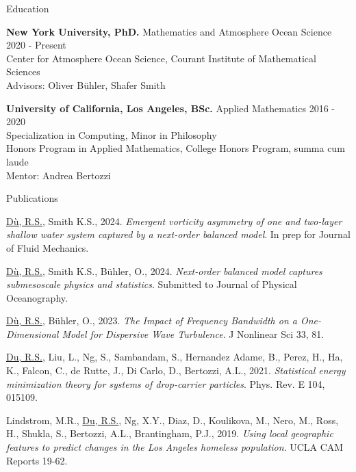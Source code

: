 \documentclass{resume} %
\begin{document}

\begin{rSection}{Education}

{\bf New York University, PhD.} Mathematics and Atmosphere Ocean Science \hfill {2020 - Present} \\
Center for Atmosphere Ocean Science, Courant Institute of Mathematical Sciences\\
Advisors: Oliver B\"uhler, Shafer Smith

{\bf University of California, Los Angeles, BSc.} Applied Mathematics \hfill {2016 - 2020} \\
Specialization in Computing, Minor in Philosophy\\
Honors Program in Applied Mathematics, College Honors Program, summa cum laude\\
Mentor: Andrea Bertozzi


\end{rSection}


\begin{rSection}{Publications}
\begin{etaremune}
    \item \underline{D\`u, R.S.}, Smith K.S., 2024. \textit{Emergent vorticity asymmetry of one and two-layer shallow water system captured by a next-order balanced model}. In prep for Journal of Fluid Mechanics.
    \item \underline{D\`u, R.S.}, Smith K.S., Bühler, O., 2024. \textit{Next-order balanced model captures submesoscale physics and statistics}. Submitted to Journal of Physical Oceanography.
    \item \underline{D\`u, R.S.}, B\"uhler, O., 2023. \textit{The Impact of Frequency Bandwidth on a One-Dimensional Model for Dispersive Wave Turbulence}. J Nonlinear Sci 33, 81.
    \item \underline{Du, R.S.}, Liu, L., Ng, S., Sambandam, S., Hernandez Adame, B., Perez, H., Ha, K., Falcon, C., de Rutte, J., Di Carlo, D., Bertozzi, A.L., 2021. \textit{Statistical energy minimization theory for systems of drop-carrier particles}. Phys. Rev. E 104, 015109.
    \item Lindstrom, M.R., \underline{Du, R.S.}, Ng, X.Y., Diaz, D., Koulikova, M., Nero, M., Ross, H., Shukla, S., Bertozzi, A.L., Brantingham, P.J., 2019. \textit{Using local geographic features to predict changes in the Los Angeles homeless population}. UCLA CAM Reports 19-62.
\end{etaremune}
\end{rSection}
\end{document}
